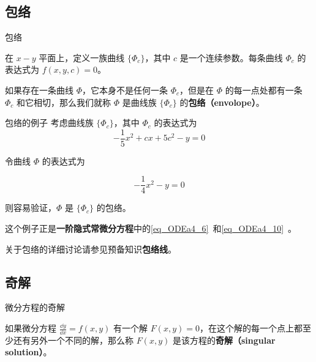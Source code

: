 

\subsection{包络}

\begin{definition}{包络}

在 $x-y$ 平面上，定义一族曲线 $\{\Phi_c\}$，其中 $c$ 是一个连续参数。每条曲线 $\Phi_c$ 的表达式为 $f(x, y, c)=0$。

如果存在一条曲线 $\Phi$，它本身不是任何一条 $\Phi_c$，但是在 $\Phi$ 的每一点处都有一条 $\Phi_c$ 和它相切，那么我们就称 $\Phi$ 是曲线族 $\{\Phi_c\}$ 的\textbf{包络（envolope）}。

\end{definition}

\begin{example}{包络的例子}
考虑曲线族 $\{\Phi_c\}$，其中 $\Phi_c$ 的表达式为
\begin{equation}
-\frac{1}{5}x^2+cx+5c^2-y=0
\end{equation}

令曲线 $\Phi$ 的表达式为

\begin{equation}
-\frac{1}{4}x^2-y=0
\end{equation}

则容易验证，$\Phi$ 是 $\{\Phi_c\}$ 的包络。

这个例子正是\textbf{一阶隐式常微分方程}中的\autoref{eq_ODEa4_6}~和\autoref{eq_ODEa4_10}~。

\end{example}

关于包络的详细讨论请参见预备知识\textbf{包络线}。


\subsection{奇解}

\begin{definition}{微分方程的奇解}

如果微分方程 $\frac{\dd y}{\dd x}=f(x, y)$ 有一个解 $F(x, y)=0$，在这个解的每一个点上都至少还有另外一个不同的解，那么称 $F(x, y)$ 是该方程的\textbf{奇解（singular solution）}。

\end{definition}

